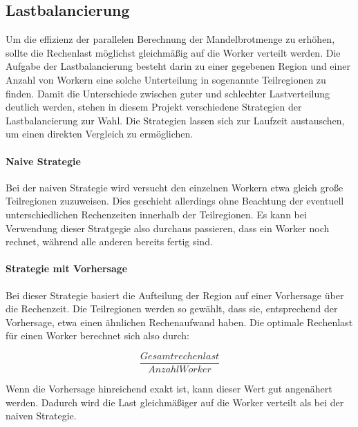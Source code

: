 \subsection{Lastbalancierung}\label{sec:load_balancing_concepts}
Um die effizienz der parallelen Berechnung der Mandelbrotmenge zu erhöhen, sollte die Rechenlast möglichst gleichmäßig auf die Worker verteilt werden.
Die Aufgabe der Lastbalancierung besteht darin zu einer gegebenen Region und einer Anzahl von Workern eine solche Unterteilung in sogenannte Teilregionen zu finden.
Damit die Unterschiede zwischen guter und schlechter Lastverteilung deutlich werden, stehen in diesem Projekt verschiedene Strategien der Lastbalancierung zur Wahl.
Die Strategien lassen sich zur Laufzeit austauschen, um einen direkten Vergleich zu ermöglichen.

\paragraph{Naive Strategie}
Bei der naiven Strategie wird versucht den einzelnen Workern etwa gleich große Teilregionen zuzuweisen.
Dies geschieht allerdings ohne Beachtung der eventuell unterschiedlichen Rechenzeiten innerhalb der Teilregionen.
Es kann bei Verwendung dieser Stratgegie also durchaus passieren, dass ein Worker noch rechnet, während alle anderen bereits fertig sind.

\paragraph{Strategie mit Vorhersage}
Bei dieser Strategie basiert die Aufteilung der Region auf einer Vorhersage über die Rechenzeit.
Die Teilregionen werden so gewählt, dass sie, entsprechend der Vorhersage, etwa einen ähnlichen Rechenaufwand haben.
Die optimale Rechenlast für einen Worker berechnet sich also durch:

\begin{equation}\label{equ:desiredN}
	\frac{Gesamtrechenlast}{AnzahlWorker}
\end{equation}

Wenn die Vorhersage hinreichend exakt ist, kann dieser Wert gut angenähert werden.
Dadurch wird die Last gleichmäßiger auf die Worker verteilt als bei der naiven Strategie.

